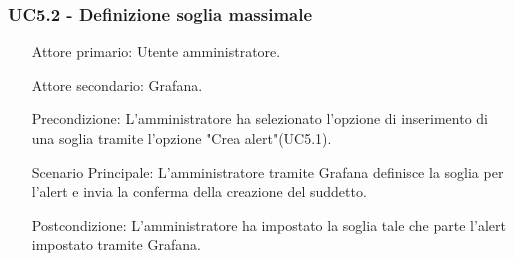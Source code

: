 \subsubsection{UC5.2 - Definizione soglia massimale}
\label{sssec:uc5.2}
\begin{description}
	\begin{enumerate}
		\item[Attore primario:] Utente amministratore.
		\item[Attore secondario:] Grafana.
		\item[Precondizione:] L'amministratore ha selezionato l'opzione di inserimento di una soglia tramite l'opzione "Crea alert"(UC5.1).
		\item[Scenario Principale:] L'amministratore tramite Grafana definisce la soglia per l'alert e invia la conferma della creazione del suddetto.
		\item[Postcondizione:] L'amministratore ha impostato la soglia tale che parte l'alert impostato tramite Grafana.
	\end{enumerate}
\end{description}